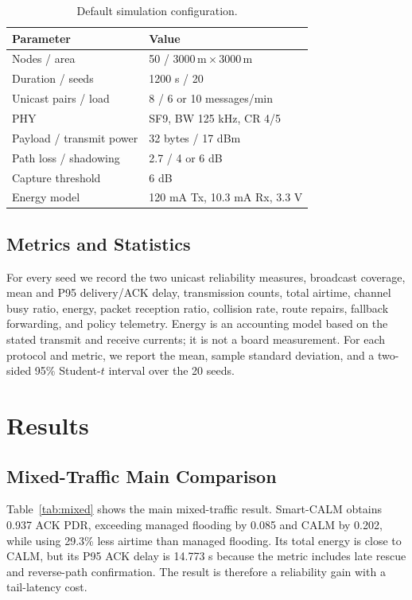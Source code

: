 \documentclass[10pt,conference,letterpaper]{IEEEtran}
\begin{document}
\begin{table}[t]
\caption{Default simulation configuration.}
\label{tab:config}
\centering
\footnotesize
\begin{tabular}{ll}
\toprule
\textbf{Parameter} & \textbf{Value}\\
\midrule
Nodes / area & 50 / $3000\,\mathrm{m}\times3000\,\mathrm{m}$\\
Duration / seeds & 1200 s / 20\\
Unicast pairs / load & 8 / 6 or 10 messages/min\\
PHY & SF9, BW 125 kHz, CR 4/5\\
Payload / transmit power & 32 bytes / 17 dBm\\
Path loss / shadowing & 2.7 / 4 or 6 dB\\
Capture threshold & 6 dB\\
Energy model & 120 mA Tx, 10.3 mA Rx, 3.3 V\\
\bottomrule
\end{tabular}
\end{table}


\subsection{Metrics and Statistics}

For every seed we record the two unicast reliability measures, broadcast
coverage, mean and P95 delivery/ACK delay, transmission counts, total airtime,
channel busy ratio, energy, packet reception ratio, collision rate, route
repairs, fallback forwarding, and policy telemetry. Energy is an accounting
model based on the stated transmit and receive currents; it is not a board
measurement. For each protocol and metric, we report the mean, sample standard
deviation, and a two-sided 95\% Student-$t$ interval over the 20 seeds.


\section{Results}

\subsection{Mixed-Traffic Main Comparison}

Table~\ref{tab:mixed} shows the main mixed-traffic result. Smart-CALM obtains
0.937 ACK PDR, exceeding managed flooding by 0.085 and CALM by 0.202, while
using 29.3\% less airtime than managed flooding. Its total energy is close to
CALM, but its P95 ACK delay is 14.773 s because the metric includes late
rescue and reverse-path confirmation. The result is therefore a reliability
gain with a tail-latency cost.
\end{document}
